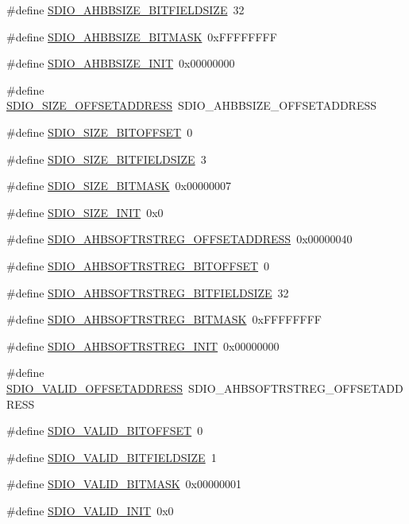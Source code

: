 \begin{DoxyCompactItemize}
\#define \hyperlink{a00571_a6e22abcd871451e7d3a627abd59cb018}{SDIO\_\-AHBBSIZE\_\-BITFIELDSIZE}~32
\item 
\#define \hyperlink{a00571_acc8194620aef41b403af5d6efd45866a}{SDIO\_\-AHBBSIZE\_\-BITMASK}~0xFFFFFFFF
\item 
\#define \hyperlink{a00571_ad7adecc6e2f63b209bddce63fed2401e}{SDIO\_\-AHBBSIZE\_\-INIT}~0x00000000
\item 
\#define \hyperlink{a00571_a0c36937def3799b603bffe71c41f1f76}{SDIO\_\-SIZE\_\-OFFSETADDRESS}~SDIO\_\-AHBBSIZE\_\-OFFSETADDRESS
\item 
\#define \hyperlink{a00571_a3e278d6edb212ceef56a335b477c49ef}{SDIO\_\-SIZE\_\-BITOFFSET}~0
\item 
\#define \hyperlink{a00571_ab39390c380788ef6956075d311baf901}{SDIO\_\-SIZE\_\-BITFIELDSIZE}~3
\item 
\#define \hyperlink{a00571_ab1217991230cc24a093d11e2553ee822}{SDIO\_\-SIZE\_\-BITMASK}~0x00000007
\item 
\#define \hyperlink{a00571_a84341c745860eadb028bf754e1f1045e}{SDIO\_\-SIZE\_\-INIT}~0x0
\item 
\#define \hyperlink{a00571_ad7c396661d5989dfeeccc8e46342c2fa}{SDIO\_\-AHBSOFTRSTREG\_\-OFFSETADDRESS}~0x00000040
\item 
\#define \hyperlink{a00571_afb3b9f89a6ffaf949d9e747dbe028fc3}{SDIO\_\-AHBSOFTRSTREG\_\-BITOFFSET}~0
\item 
\#define \hyperlink{a00571_a8e550f09a8488333728db4252bb15cde}{SDIO\_\-AHBSOFTRSTREG\_\-BITFIELDSIZE}~32
\item 
\#define \hyperlink{a00571_a95815433972fe53e1dee8d304dd63ec5}{SDIO\_\-AHBSOFTRSTREG\_\-BITMASK}~0xFFFFFFFF
\item 
\#define \hyperlink{a00571_a0c4b19e2c069e7c1c07b1513c5cd265e}{SDIO\_\-AHBSOFTRSTREG\_\-INIT}~0x00000000
\item 
\#define \hyperlink{a00571_a5bba14bea2b791f926e150b47bd03783}{SDIO\_\-VALID\_\-OFFSETADDRESS}~SDIO\_\-AHBSOFTRSTREG\_\-OFFSETADDRESS
\item 
\#define \hyperlink{a00571_a4889c93418d97e365f240801e28256bc}{SDIO\_\-VALID\_\-BITOFFSET}~0
\item 
\#define \hyperlink{a00571_a53394a79c4d87db901359a5fdc6e10d7}{SDIO\_\-VALID\_\-BITFIELDSIZE}~1
\item 
\#define \hyperlink{a00571_aacc18c3f6c2703fdb27a4b37c10086a8}{SDIO\_\-VALID\_\-BITMASK}~0x00000001
\item 
\#define \hyperlink{a00571_a0fb0d2c88f383ef4261b724b26b5868a}{SDIO\_\-VALID\_\-INIT}~0x0
\end{DoxyCompactItemize}


